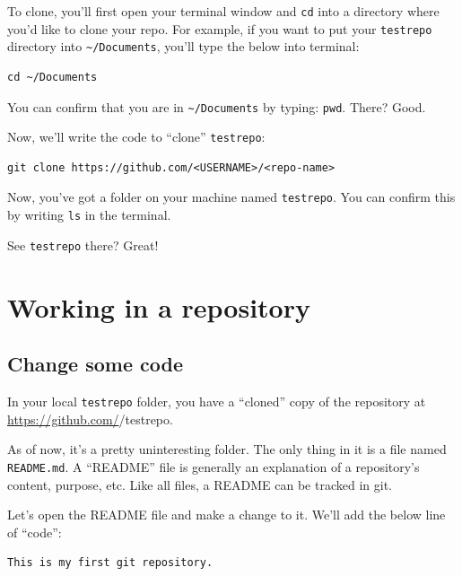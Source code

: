 \documentclass[]{book}
\begin{document}
To clone, you'll first open your terminal window and \texttt{cd} into a directory where you'd like to clone your repo. For example, if you want to put your \texttt{testrepo} directory into \texttt{\textasciitilde{}/Documents}, you'll type the below into terminal:

\begin{verbatim}
cd ~/Documents
\end{verbatim}

You can confirm that you are in \texttt{\textasciitilde{}/Documents} by typing: \texttt{pwd}. There? Good.

Now, we'll write the code to ``clone'' \texttt{testrepo}:

\begin{verbatim}
git clone https://github.com/<USERNAME>/<repo-name>
\end{verbatim}

Now, you've got a folder on your machine named \texttt{testrepo}. You can confirm this by writing \texttt{ls} in the terminal.

See \texttt{testrepo} there? Great!

\hypertarget{working-in-a-repository}{%
\section*{Working in a repository}\label{working-in-a-repository}}

\hypertarget{change-some-code}{%
\subsection*{Change some code}\label{change-some-code}}

In your local \texttt{testrepo} folder, you have a ``cloned'' copy of the repository at \url{https://github.com/}/testrepo.

As of now, it's a pretty uninteresting folder. The only thing in it is a file named \texttt{README.md}. A ``README'' file is generally an explanation of a repository's content, purpose, etc. Like all files, a README can be tracked in git.

Let's open the README file and make a change to it. We'll add the below line of ``code'':

\begin{verbatim}
This is my first git repository.
\end{verbatim}
\end{document}
